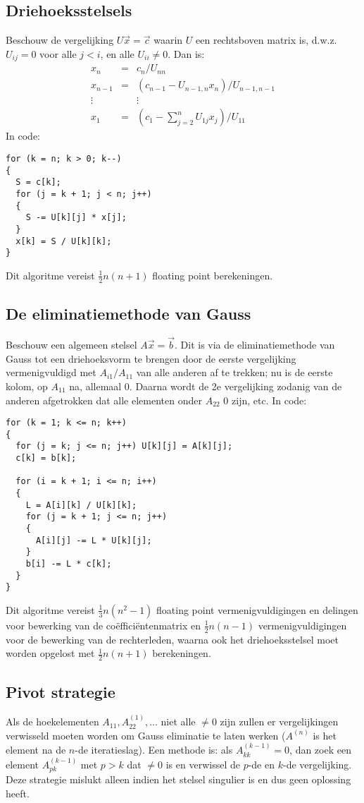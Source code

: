 \subsection{Driehoeksstelsels}
Beschouw de vergelijking $U\vec{x}=\vec{c}$ waarin $U$ een rechtsboven matrix
is, d.w.z. $U_{ij}=0$ voor alle $j<i$, en alle $U_{ii}\neq0$. Dan is:
\begin{eqnarray*}
x_n    &=&c_n/U_{nn}\\
x_{n-1}&=&(c_{n-1}-U_{n-1,n}x_n)/U_{n-1,n-1}\\
\vdots & &\vdots\\
x_1    &=&(c_1-\sum_{j=2}^nU_{1j}x_j)/U_{11}
\end{eqnarray*}
In code:
\begin{verbatim}
for (k = n; k > 0; k--)
{
  S = c[k];
  for (j = k + 1; j < n; j++)
  {
    S -= U[k][j] * x[j];
  }
  x[k] = S / U[k][k];
}
\end{verbatim}
Dit algoritme vereist $\frac{1}{2}n(n+1)$ floating point berekeningen.

\subsection{De eliminatiemethode van Gauss}
Beschouw een algemeen stelsel $A\vec{x}=\vec{b}$. Dit is via de eliminatiemethode
van Gauss tot een driehoeksvorm te brengen door de eerste vergelijking
vermenigvuldigd met $A_{i1}/A_{11}$ van alle anderen af te trekken; nu is de
eerste kolom, op $A_{11}$ na, allemaal 0. Daarna wordt de 2e vergelijking zodanig
van de anderen afgetrokken dat alle elementen onder $A_{22}$ 0 zijn, etc.
In code:
\begin{verbatim}
for (k = 1; k <= n; k++)
{
  for (j = k; j <= n; j++) U[k][j] = A[k][j];
  c[k] = b[k];

  for (i = k + 1; i <= n; i++)
  {
    L = A[i][k] / U[k][k];
    for (j = k + 1; j <= n; j++)
    {
      A[i][j] -= L * U[k][j];
    }
    b[i] -= L * c[k];
  }
}
\end{verbatim}
Dit algoritme vereist $\frac{1}{3}n(n^2-1)$ floating point vermenigvuldigingen
en delingen voor bewerking van de co\"effici\"entenmatrix en $\frac{1}{2}n(n-1)$
vermenigvuldigingen voor de bewerking van de rechterleden, waarna ook het
driehoeksstelsel moet worden opgelost met $\frac{1}{2}n(n+1)$ berekeningen.

\subsection{Pivot strategie}
Als de hoekelementen $A_{11}, A^{(1)}_{22},...$ niet alle $\neq0$ zijn zullen
er vergelijkingen verwisseld moeten worden om Gauss eliminatie te laten werken
($A^{(n)}$ is het element na de $n$-de iteratieslag).
Een methode is: als $A^{(k-1)}_{kk}=0$, dan zoek een element $A^{(k-1)}_{pk}$
met $p>k$ dat $\neq0$ is en verwissel de $p$-de en $k$-de vergelijking. Deze
strategie mislukt alleen indien het stelsel singulier is en dus geen oplossing
heeft.

